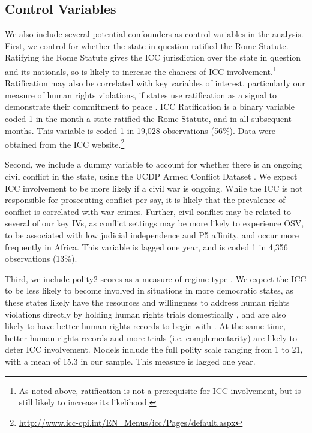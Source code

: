 \subsection{Control Variables}

We also include several potential confounders as control variables in the analysis. First, we control for whether the state in question ratified the Rome Statute. Ratifying the Rome Statute gives the ICC jurisdiction over the state in question and its nationals, so is likely to increase the chances of ICC involvement.\footnote{As noted above, ratification is not a prerequisite for ICC involvement, but is still likely to increase its likelihood.} Ratification may also be correlated with key variables of interest, particularly our measure of human rights violations, if states use ratification as a signal to demonstrate their commitment to peace \citep{simmons2010credible}. ICC Ratification is a binary variable coded 1 in the month a state ratified the Rome Statute, and in all subsequent months. This variable is coded 1 in 19,028 observations (56\%). Data were obtained from the ICC website.\footnote{\url{http://www.icc-cpi.int/EN\_Menus/icc/Pages/default.aspx}}

Second, we include a dummy variable to account for whether there is an ongoing civil conflict in the state, using the UCDP Armed Conflict Dataset \citep{themner2012armed}. We expect ICC involvement to be more likely if a civil war is ongoing. While the ICC is not responsible for prosecuting conflict per say, it is likely that the prevalence of conflict is correlated with war crimes. Further, civil conflict may be related to several of our key IVs, as conflict settings may be more likely to experience OSV, to be associated with low judicial independence and P5 affinity, and occur more frequently in Africa. This variable is lagged one year, and is coded 1 in 4,356 observations (13\%).

Third, we include polity2 scores as a measure of regime type \citep{marshall2018polity}. We expect the ICC to be less likely to become involved in situations in more democratic states, as these states likely have the resources and willingness to address human rights violations directly by holding human rights trials domestically \citep{kim2010explaining, herz1982dictatorship}, and are also likely to have better human rights records to begin with \citep{davenport:armstrongii:2004, davenport2007state}. At the same time, better human rights records and more trials (i.e. complementarity) are likely to deter ICC involvement. Models include the full polity scale ranging from 1 to 21, with a mean of 15.3 in our sample. This measure is lagged one year.

